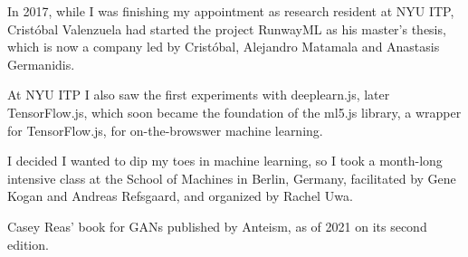 In 2017, while I was finishing my appointment as research resident at NYU ITP, Cristóbal Valenzuela had started the project RunwayML as his master's thesis, which is now a company led by Cristóbal, Alejandro Matamala and Anastasis Germanidis.

At NYU ITP I also saw the first experiments with deeplearn.js, later TensorFlow.js, which soon became the foundation of the ml5.js library, a wrapper for TensorFlow.js, for on-the-browswer machine learning.

I decided I wanted to dip my toes in machine learning, so I took a month-long intensive class at the School of Machines in Berlin, Germany, facilitated by Gene Kogan and Andreas Refsgaard, and organized by Rachel Uwa.

Casey Reas' book for GANs published by Anteism, as of 2021 on its second edition.
